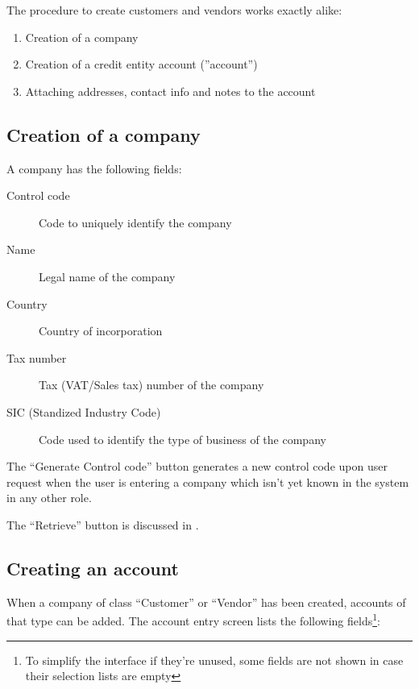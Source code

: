 The procedure to create customers and vendors works exactly alike:

\begin{enumerate}
\item Creation of a company
\item Creation of a credit entity account (''account'')
\item Attaching addresses, contact info and notes to the account 
\end{enumerate}

\subsection{Creation of a company}
\label{subsec-worflows-customer-creating-company}

A company has the following fields:

\begin{description}
\item [Control code] Code to uniquely identify the company
\item [Name] Legal name of the company
\item [Country] Country of incorporation
\item [Tax number] Tax (VAT/Sales tax) number of the company
\item [SIC (Standized Industry Code)] Code used to identify
    the type of business of the company
\end{description}

The ``Generate Control code'' button generates a new control code upon
user request when the user is entering a company which isn't yet known
in the system in any other role.

The ``Retrieve'' button is discussed in .


\subsection{Creating an account}
\label{subsec-workflows-customers-creating-account}

When a company of class ``Customer'' or ``Vendor'' has been created,
accounts of that type can be added. The account entry screen lists the
following fields\footnote{To simplify the interface if they're unused, some fields
are not shown in case their selection lists are empty}:

